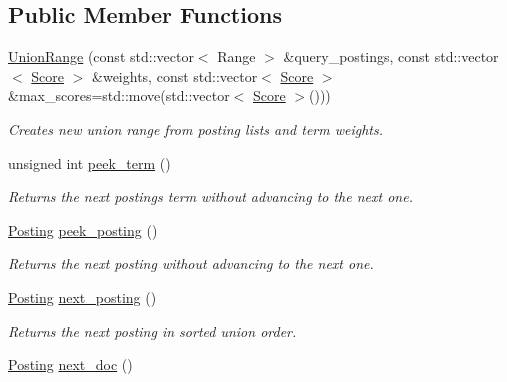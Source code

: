 \subsection*{Public Member Functions}
\begin{DoxyCompactItemize}
\item 
\mbox{\hyperlink{classirkit_1_1UnionRange_a23072335eaa144321314fbbdd39e9423}{Union\+Range}} (const std\+::vector$<$ Range $>$ \&query\+\_\+postings, const std\+::vector$<$ \mbox{\hyperlink{classirkit_1_1UnionRange_a47fb098a85581f5e33f4203e16245dae}{Score}} $>$ \&weights, const std\+::vector$<$ \mbox{\hyperlink{classirkit_1_1UnionRange_a47fb098a85581f5e33f4203e16245dae}{Score}} $>$ \&max\+\_\+scores=std\+::move(std\+::vector$<$ \mbox{\hyperlink{classirkit_1_1UnionRange_a47fb098a85581f5e33f4203e16245dae}{Score}} $>$()))
\begin{DoxyCompactList}\small\item\em Creates new union range from posting lists and term weights. \end{DoxyCompactList}\item 
unsigned int \mbox{\hyperlink{classirkit_1_1UnionRange_aa985f4985486d3df259be0c932340f18}{peek\+\_\+term}} ()
\begin{DoxyCompactList}\small\item\em Returns the next posting\textquotesingle{}s term without advancing to the next one. \end{DoxyCompactList}\item 
\mbox{\hyperlink{classirkit_1_1UnionRange_a5f694970419f5a60d7fd41d740556229}{Posting}} \mbox{\hyperlink{classirkit_1_1UnionRange_a5c2f9a6ec77c812febdf1778e4b9b3f6}{peek\+\_\+posting}} ()
\begin{DoxyCompactList}\small\item\em Returns the next posting without advancing to the next one. \end{DoxyCompactList}\item 
\mbox{\hyperlink{classirkit_1_1UnionRange_a5f694970419f5a60d7fd41d740556229}{Posting}} \mbox{\hyperlink{classirkit_1_1UnionRange_aedb2ab6f4a5f0b9f57cf2c55214ed42e}{next\+\_\+posting}} ()
\begin{DoxyCompactList}\small\item\em Returns the next posting in sorted union order. \end{DoxyCompactList}\item 
\mbox{\hyperlink{classirkit_1_1UnionRange_a5f694970419f5a60d7fd41d740556229}{Posting}} \mbox{\hyperlink{classirkit_1_1UnionRange_a9161a468e74df4e76cd04104763f7d97}{next\+\_\+doc}} ()

\end{DoxyCompactItemize}
